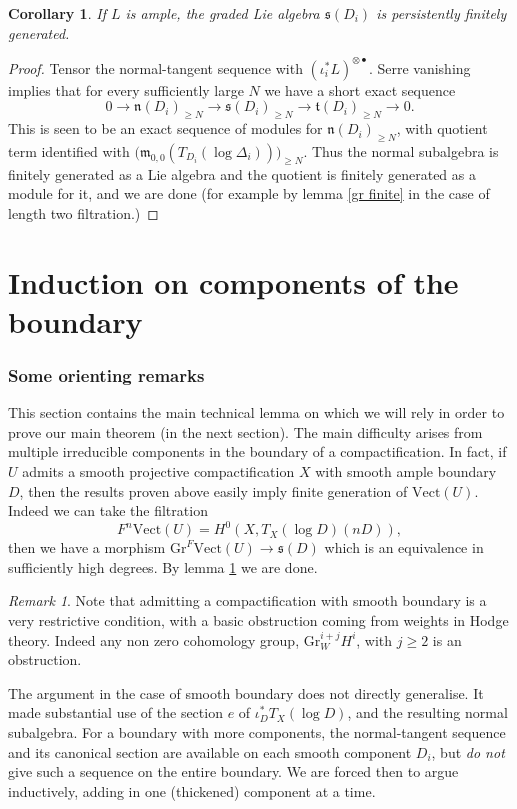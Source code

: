 \documentclass[12pt, oneside]{amsart}       %
\newtheorem{corollary}[theorem]{Corollary}
\theoremstyle{remark}
\newtheorem*{remark}{Remark}
\renewcommand{\geq}{\geqslant}
\begin{document}
\begin{corollary}\label{symb finite} If $L$ is ample, the graded Lie algebra $\mathfrak{s}(D_i)$ is persistently finitely generated. \end{corollary}

\begin{proof} Tensor the normal-tangent sequence with $(\iota_i^*L)^{\otimes\bullet}$. Serre vanishing implies that for every sufficiently large $N$ we have a short exact sequence
$$0\to\mathfrak{n}(D_i)_{\geq N}\to\mathfrak{s}(D_i)_{\geq N}\to\mathfrak{t}(D_i)_{\geq N}\to0.$$
This is seen to be an exact sequence of modules for $\mathfrak{n}(D_i)_{\geq N}$, with quotient term identified with $\big(\mathfrak{m}_{0,0}(T_{D_i}(\log\Delta_i))\big)_{\geq N}$. Thus the normal subalgebra is finitely generated as a Lie algebra and the quotient is finitely generated as a module for it, and we are done (for example by lemma \ref{gr finite} in the case of length two filtration.)\end{proof}



\section{Induction on components of the boundary}

\subsubsection{Some orienting remarks} This section contains the main technical lemma on which we will rely in order to prove our main theorem (in the next section). The main difficulty arises from multiple irreducible components in the boundary of a compactification. In fact, if $U$ admits a smooth projective compactification $X$ with smooth ample boundary $D$, then the results proven above easily imply finite generation of $\mathrm{Vect}(U)$. 
Indeed we can take the filtration $$F^n\mathrm{Vect}(U)=H^0(X,T_X(\log D)(nD)),$$ then we have a morphism $\mathrm{Gr}^F\mathrm{Vect}(U)\to\mathfrak{s}(D)$ which is an equivalence in sufficiently high degrees. By lemma \ref{symb finite} we are done. \begin{remark}Note that admitting a compactification with smooth boundary is a very restrictive condition, with a basic obstruction coming from weights in Hodge theory. Indeed any non zero cohomology group, $\mathrm{Gr}_W^{i+j}H^i$, with $j\geq 2$ is an obstruction.\end{remark}The argument in the case of smooth boundary does not directly generalise. It made substantial use of the section $e$ of $\iota_D^*T_X(\log D)$, and the resulting normal subalgebra. For a boundary with more components, the normal-tangent sequence and its canonical section are available on each smooth component $D_i$, but \emph{do not} give such a sequence on the entire boundary. We are forced then to argue inductively, adding in one (thickened) component at a time.
\end{document}
